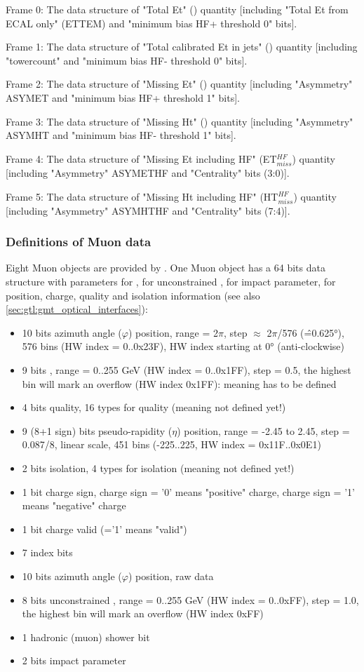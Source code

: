 Frame 0: The data structure of "Total Et" (\ett) quantity [including "Total Et from ECAL only" (ETTEM) and "minimum bias HF+ threshold 0" bits].

Frame 1: The data structure of "Total calibrated Et in jets" (\htt) quantity [including "towercount" and "minimum bias HF- threshold 0" bits].

Frame 2: The data structure of "Missing Et" (\etm) quantity [including "Asymmetry" ASYMET and "minimum bias HF+ threshold 1" bits].

Frame 3: The data structure of "Missing Ht" (\htm) quantity [including "Asymmetry" ASYMHT and "minimum bias HF- threshold 1" bits].

Frame 4: The data structure of "Missing Et including HF" (ET$_{miss}^{HF}$) quantity [including "Asymmetry" ASYMETHF and "Centrality" bits (3:0)].

Frame 5: The data structure of "Missing Ht including HF" (HT$_{miss}^{HF}$) quantity [including "Asymmetry" ASYMHTHF and "Centrality" bits (7:4)].

\clearpage

\subsubsection{Definitions of Muon data}
\label{sec:gtl:muon_data}
Eight Muon objects are provided by \gmt. One Muon object has a 64 bits data structure with parameters for \pt, for unconstrained \pt, for impact parameter, for position, charge, quality and isolation information (see also \ref{sec:gtl:gmt_optical_interfaces}):\\
\begin{itemize}
\item 10 bits azimuth angle ($\varphi$) position, range = 2$\pi$, step $\approx$ 2$\pi$/576 (\^=0.625°), 576 bins (HW index = 0..0x23F), HW index starting at 0° (anti-clockwise)
\item 9 bits \pt, range = 0..255 GeV (HW index = 0..0x1FF), step = 0.5, the highest bin will mark an overflow (HW index 0x1FF): meaning has to be defined
\item 4 bits quality, 16 types for quality (meaning not defined yet!)
\item 9 (8+1 sign) bits pseudo-rapidity ($\eta$) position, range = -2.45 to 2.45, step = 0.087/8, linear scale, 451 bins (-225..225, HW index = 0x11F..0x0E1)
\item 2 bits isolation, 4 types for isolation (meaning not defined yet!)
\item 1 bit charge sign, charge sign = '0' means "positive" charge, charge sign = '1' means "negative" charge
\item 1 bit charge valid (='1' means "valid")
\item 7 index bits
\item 10 bits azimuth angle ($\varphi$) position, raw data
\item 8 bits unconstrained \pt, range = 0..255 GeV (HW index = 0..0xFF), step = 1.0, the highest bin will mark an overflow (HW index 0xFF)
\item 1 hadronic (muon) shower bit
\item 2 bits impact parameter
\end{itemize}


